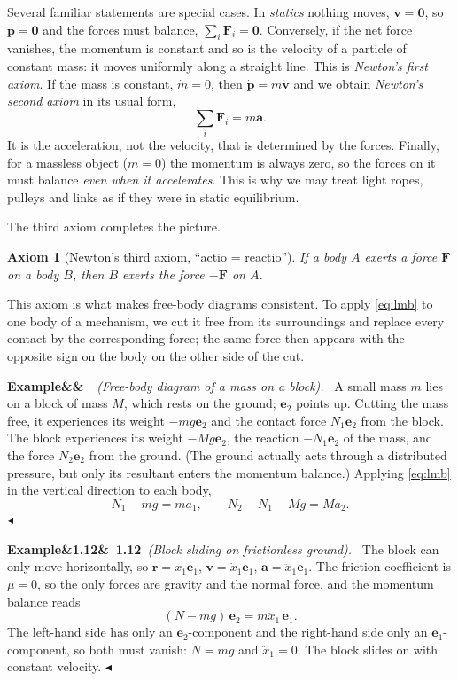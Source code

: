 \documentclass[11pt,a4paper,oneside]{report}
\numberwithin{equation}{chapter}
\newcommand{\vect}[1]{\bm{#1}}
\newcommand{\e}[1]{\vect{e}_{#1}}
\theoremstyle{plain}
\newtheorem{axiom}[theorem]{Axiom}
\theoremstyle{definition}
\theoremstyle{remark}
\newenvironment{example}[2]{%
  \par\addvspace{\bigskipamount}\noindent
  \textbf{Example\ifx&#1&\else~#1\fi}\ \textit{(#2).}\ \ignorespaces}%
  {\hfill$\blacktriangleleft$\par\addvspace{\bigskipamount}}
\begin{document}
Several familiar statements are special cases. In \emph{statics} nothing moves, $\vect v=\vect 0$, so $\vect p=\vect 0$
and the forces must balance, $\sum_i\vect F_i=\vect 0$. Conversely, if the net force vanishes, the momentum is
constant and so is the velocity of a particle of constant mass: it moves uniformly along a straight line. This is
\emph{Newton's first axiom}. If the mass is constant, $\dot m=0$, then $\dot{\vect p}=m\dot{\vect v}$ and we
obtain \emph{Newton's second axiom} in its usual form,
\begin{equation}
  \sum_i\vect F_i=m\vect a .
\end{equation}
It is the acceleration, not the velocity, that is determined by the forces. Finally, for a massless object ($m=0$)
the momentum is always zero, so the forces on it must balance \emph{even when it accelerates}. This is why we may
treat light ropes, pulleys and links as if they were in static equilibrium.

The third axiom completes the picture.

\begin{axiom}[Newton's third axiom, ``actio = reactio'']
If a body $A$ exerts a force $\vect F$ on a body $B$, then $B$ exerts the force $-\vect F$ on $A$.
\end{axiom}

This axiom is what makes free-body diagrams consistent. To apply \eqref{eq:lmb} to one body of a mechanism, we
cut it free from its surroundings and replace every contact by the corresponding force; the same force then appears
with the opposite sign on the body on the other side of the cut.

\begin{example}{}{Free-body diagram of a mass on a block}
A small mass $m$ lies on a block of mass $M$, which rests on the ground; $\e2$ points up. Cutting the mass free, it
experiences its weight $-mg\e2$ and the contact force $N_1\e2$ from the block. The block experiences its weight
$-Mg\e2$, the reaction $-N_1\e2$ of the mass, and the force $N_2\e2$ from the ground. (The ground actually acts
through a distributed pressure, but only its resultant enters the momentum balance.) Applying \eqref{eq:lmb} in the
vertical direction to each body,
\[
  N_1-mg=ma_1,\qquad N_2-N_1-Mg=Ma_2 .
\]
\end{example}

\begin{example}{1.12}{Block sliding on frictionless ground}
The block can only move horizontally, so $\vect r=x_1\e1$, $\vect v=\dot x_1\e1$, $\vect a=\ddot x_1\e1$. The friction
coefficient is $\mu=0$, so the only forces are gravity and the normal force, and the momentum balance reads
\[
  (N-mg)\,\e2=m\ddot x_1\,\e1 .
\]
The left-hand side has only an $\e2$-component and the right-hand side only an $\e1$-component, so both must
vanish: $N=mg$ and $\ddot x_1=0$. The block slides on with constant velocity.
\end{example}
\end{document}
